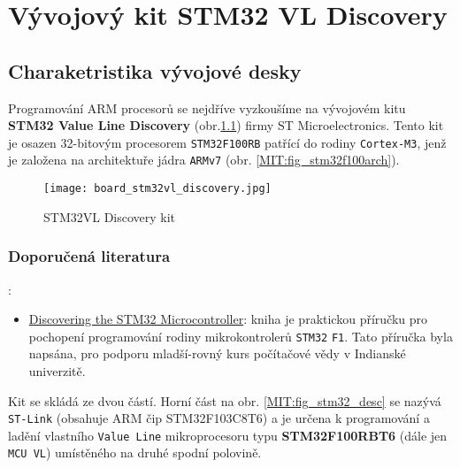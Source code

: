 \chapter{Vývojový kit STM32 VL Discovery}
\minitoc
  \section{Charaketristika vývojové desky}
    Programování ARM procesorů se nejdříve vyzkoušíme na vývojovém kitu \textbf{STM32 Value Line 
    Discovery} (obr.\ref{MIT:fig_stm32vlkit}) firmy ST Microelectronics. Tento kit je osazen 
    32-bitovým procesorem \texttt{STM32F100RB} patřící do rodiny \texttt{Cortex-M3}, jenž je 
    založena na architektuře jádra \texttt{ARMv7} (obr. \ref{MIT:fig_stm32f100arch}). 
  
    \begin{figure}[ht!] %
      \centering
      \texttt{[image: board\_stm32vl\_discovery.jpg]}
      \caption{STM32VL Discovery kit}
      \label{MIT:fig_stm32vlkit}
    \end{figure}
    
    \subsection{Doporučená literatura}:
    \begin{itemize}
      \item \href{http://librarian/stable.php?id=143}{Discovering the STM32 Microcontroller}: 
            kniha je praktickou příručku pro pochopení programování rodiny mikrokontrolerů 
            \texttt{STM32} \texttt{F1}. Tato příručka byla napsána, pro podporu mladší-rovný kurs 
            počítačové vědy v 
      Indianské univerzitě. 
    \end{itemize}
  
    Kit se skládá ze dvou částí. Horní část na obr. \ref{MIT:fig_stm32_desc} se nazývá 
    \texttt{ST-Link} (obsahuje ARM čip STM32F103C8T6) a je určena k programování a ladění vlastního 
    \texttt{Value Line} mikroprocesoru typu \textbf{STM32F100RBT6} (dále jen \texttt{MCU VL}) 
    umístěného na druhé spodní polovině.
  
